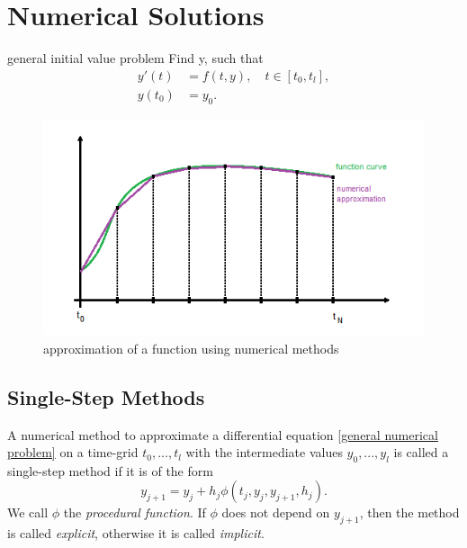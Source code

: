 \section{Numerical Solutions}
	\begin{frame}
		general initial value problem
		Find y, such that
		\begin{align}
			\label{general numerical problem}
			y'(t) &= f(t,y), \quad t \in [t_0, t_l], \\
			y(t_0) &= y_0.
		\end{align}
		
		\begin{figure}[H]
			\centering
			\includegraphics[scale=0.7]{../Tex/pictures/num_approx.png}
			\caption{approximation of a function using numerical methods}
			\label{fig:numerical approximation}
		\end{figure}
		
	\end{frame}
	\subsection{Single-Step Methods}
	\begin{frame}
		\begin{definition}
			\label{def:single step mehod}
			A numerical method to approximate a differential equation \ref{general numerical problem} on a time-grid $t_0,...,t_l$ with the intermediate values $y_0,...,y_l$ is called a single-step method if it is of the form
			\begin{equation}
				\label{single-step method}
				y_{j+1} = y_j + h_j \phi(t_j,y_j, y_{j+1},h_j).
			\end{equation}
			We call $\phi$ the \emph{procedural function}. If $\phi$ does not depend on $y_{j+1}$, then the method is called \emph{explicit}, otherwise it is called \emph{implicit}.
		\end{definition}
	\end{frame}
	
